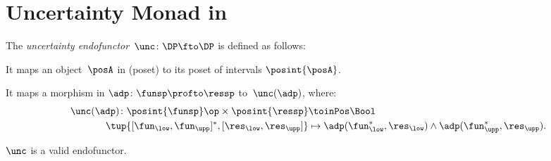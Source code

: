 
\section{Uncertainty Monad in \DP}



\begin{definition}
  \label{def:uncertainty-endofunctor}
    \label{def:unc-endof}
The \emph{uncertainty endofunctor}~$\unc\colon \DP\fto \DP$ is defined as follows:
\begin{compactenum}
  \item It maps an object~$\posA$ in \DP (poset) to its poset of intervals $\posint{\posA}$.
  \item It maps a morphism in \DP $\adp \colon \funsp \profto \ressp$ to~$\unc(\adp)$, where:
  \begin{equation}
  \label{eq:unc_dp}
    \begin{aligned}
      \unc(\adp)\colon \posint{\funsp}\op \times \posint{\ressp}&\toinPos \Bool\\
      \tup{[\fun_{\low},\fun_{\upp}]^*,[\res_{\low},\res_{\upp}]}&\mapsto \adp(\fun_{\low}^*,\res_{\low})\wedge  \adp(\fun_{\upp}^*,\res_{\upp}).
    \end{aligned}
  \end{equation}
\end{compactenum}
\end{definition}

\begin{lemma}
\label{lem:uncendofunctor}
$\unc$ is a valid  endofunctor.
\end{lemma}

